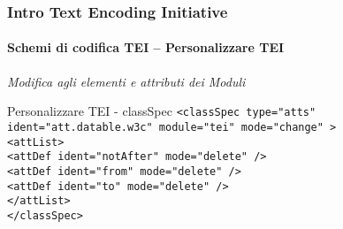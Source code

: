 \begin{frame}
	\frametitle{Intro Text Encoding Initiative}
	\framesubtitle{Schemi di codifica TEI – Personalizzare TEI}
	\addtocounter{nframe}{1}
    \textit{Modifica agli elementi e attributi dei Moduli}
    \begin{block}{Personalizzare TEI - classSpec}
        \texttt{<classSpec type="atts" ident="att.datable.w3c" module="tei" mode="change" >}
        \\\texttt{<attList> }
        \\\texttt{<attDef ident="notAfter" mode="delete" />}
        \\\texttt{<attDef ident="from" mode="delete" />}
        \\\texttt{<attDef ident="to" mode="delete" /> }
        \\\texttt{</attList>}
        \\\texttt{</classSpec>}
    \end{block}
    
\end{frame}












